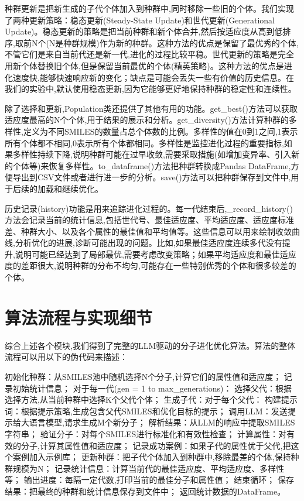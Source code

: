 种群更新是把新生成的子代个体加入到种群中,同时移除一些旧的个体。我们实现了两种更新策略：稳态更新(Steady-State Update)和世代更新(Generational Update)。稳态更新的策略是把当前种群和新个体合并,然后按适应度从高到低排序,取前N个(N是种群规模)作为新的种群。这种方法的优点是保留了最优秀的个体,不管它们是来自当前代还是新一代,进化的过程比较平稳。世代更新的策略是完全用新个体替换旧个体,但是保留当前最优的个体(精英策略)。这种方法的优点是进化速度快,能够快速响应新的变化；缺点是可能会丢失一些有价值的历史信息。在我们的实验中,默认使用稳态更新,因为它能够更好地保持种群的稳定性和连续性。

除了选择和更新,Population类还提供了其他有用的功能。get\_best()方法可以获取适应度最高的N个个体,用于结果的展示和分析。get\_diversity()方法计算种群的多样性,定义为不同SMILES的数量占总个体数的比例。多样性的值在0到1之间,1表示所有个体都不相同,0表示所有个体都相同。多样性是监控进化过程的重要指标,如果多样性持续下降,说明种群可能在过早收敛,需要采取措施(如增加变异率、引入新的个体等)来恢复多样性。to\_dataframe()方法把种群转换成Pandas DataFrame,方便导出到CSV文件或者进行进一步的分析。save()方法可以把种群保存到文件中,用于后续的加载和继续优化。

历史记录(history)功能是用来追踪进化过程的。每一代结束后,\_record\_history()方法会记录当前的统计信息,包括世代号、最佳适应度、平均适应度、适应度标准差、种群大小、以及各个属性的最佳值和平均值等。这些信息可以用来绘制收敛曲线,分析优化的进展,诊断可能出现的问题。比如,如果最佳适应度连续多代没有提升,说明可能已经达到了局部最优,需要考虑改变策略；如果平均适应度和最佳适应度的差距很大,说明种群的分布不均匀,可能存在一些特别优秀的个体和很多较差的个体。

\section{算法流程与实现细节}

综合上述各个模块,我们得到了完整的LLM驱动的分子进化优化算法。算法的整体流程可以用以下的伪代码来描述：

初始化种群：从SMILES池中随机选择N个分子,计算它们的属性值和适应度；
记录初始统计信息；
对于每一代(gen = 1 to max\_generations)：
  选择父代：根据选择方法,从当前种群中选择K个父代个体；
  生成子代：对于每个父代：
    构建提示词：根据提示策略,生成包含父代SMILES和优化目标的提示；
    调用LLM：发送提示给大语言模型,请求生成M个新分子；
    解析结果：从LLM的响应中提取SMILES字符串；
    验证分子：对每个SMILES进行标准化和有效性检查；
    计算属性：对有效的分子,计算其属性值和适应度；
    记录成功案例：如果子代的属性优于父代,把这个案例加入示例库；
  更新种群：把子代个体加入到种群中,移除最差的个体,保持种群规模为N；
  记录统计信息：计算当前代的最佳适应度、平均适应度、多样性等；
  输出进度：每隔一定代数,打印当前的最佳分子和属性值；
结束循环；
保存结果：把最终的种群和统计信息保存到文件中；
返回统计数据的DataFrame。

